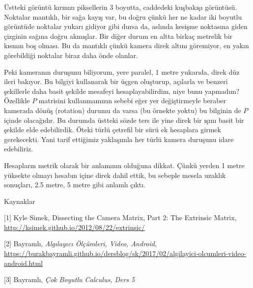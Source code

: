 \documentclass[12pt,fleqn]{article}\usepackage{../../common}
\begin{document}
Üstteki görüntü kırmızı piksellerin 3 boyutta, caddedeki kuşbakışı
görüntüsü. Noktalar mantıklı, bir sağa kayış var, bu doğru çünkü her ne
kadar iki boyutlu görüntüde noktalar yukarı gidiyor gibi dursa da, aslında
kesişme noktasına giden çizginin sağına doğru akmışlar. Bir diğer durum en
altta birkaç metrelik bir kısmın boş olması. Bu da mantıklı çünkü kamera
direk altını göremiyor, en yakın görebildiği noktalar biraz daha önde
olanlar.

Peki kameranın duruşunu biliyorum, yere paralel, 1 metre yukarıda, direk
düz ileri bakıyor. Bu bilgiyi kullanarak bir üçgen oluşturup, açılarla ve
benzeri şekillerle daha basit şekilde mesafeyi hesaplayabilirdim, niye bunu
yapmadım? Özellikle $P$ matrisini kullanmamızın sebebi eğer yer
değiştirmeyle beraber kamerada dönüş (rotation) durumu da varsa (bu örnekte
yoktu) bu bilginin de $P$ içinde olacağıdır. Bu durumda üstteki sözde ters
ile yine direk bir ışını basit bir şekilde elde edebilirdik. Öteki türlü
çetrefil bir sürü ek hesaplara girmek gerekecekti. Yani tarif ettiğimiz
yaklaşımla her türlü kamera duruşunu idare edebiliriz.

Hesapların metrik olarak bir anlamının olduğuna dikkat. Çünkü yerden 1
metre yüksekte olmayı hesabın içine direk dahil ettik, bu sebeple mesela
uzaklık sonuçları, 2.5 metre, 5 metre gibi anlamlı çıktı. 

Kaynaklar

[1] Kyle Simek, Dissecting the Camera Matrix, Part 2: The Extrinsic Matrix,
\url{http://ksimek.github.io/2012/08/22/extrinsic/}

[2] Bayramlı, 
    {\em Algılayıcı Ölçümleri, Video, Android}, 
     \url{https://burakbayramli.github.io/dersblog/sk/2017/02/algilayici-olcumleri-video-android.html}

[3] Bayramlı, {\em Çok Boyutlu Calculus, Ders 5}
\end{document}
